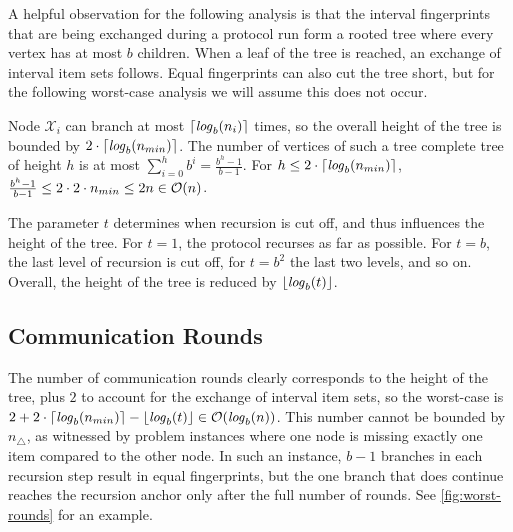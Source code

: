 A helpful observation for the following analysis is that the interval fingerprints that are being exchanged during a protocol run form a rooted tree where every vertex has at most $b$ children. When a leaf of the tree is reached, an exchange of interval item sets follows. Equal fingerprints can also cut the tree short, but for the following worst-case analysis we will assume this does not occur.

Node $\mathcal{X}_i$ can branch at most $\lceil\mathit{log}_{b}(n_i)\rceil$ times, so the overall height of the tree is bounded by $2 \cdot\lceil\mathit{log}_{b}(n_{min})\rceil$. The number of vertices of such a tree complete tree of height $h$ is at most $\sum_{i=0}^{h} b^{i} = \frac{b^{h} - 1}{b - 1}$. For $h \leq 2 \cdot\lceil\mathit{log}_{b}(n_{min})\rceil$, $\frac{b^{h} - 1}{b - 1} \leq 2 \cdot 2 \cdot n_{min} \leq 2n \in \mathcal{O}(n)$.

The parameter $t$ determines when recursion is cut off, and thus influences the height of the tree. For $t = 1$, the protocol recurses as far as possible. For $t = b$, the last level of recursion is cut off, for $t = b^2$ the last two levels, and so on. Overall, the height of the tree is reduced by $\lfloor\mathit{log}_{b}(t)\rfloor$.

\subsection{Communication Rounds}

The number of communication rounds clearly corresponds to the height of the tree, plus $2$ to account for the exchange of interval item sets, so the worst-case is $2 + 2 \cdot\lceil\mathit{log}_{b}(n_{min})\rceil - \lfloor\mathit{log}_{b}(t)\rfloor \in \mathcal{O}(\mathit{log}_{b}(n))$. This number cannot be bounded by $n_{\triangle}$, as witnessed by problem instances where one node is missing exactly one item compared to the other node. In such an instance, $b - 1$ branches in each recursion step result in equal fingerprints, but the one branch that does continue reaches the recursion anchor only after the full number of rounds. See \cref{fig:worst-rounds} for an example.


